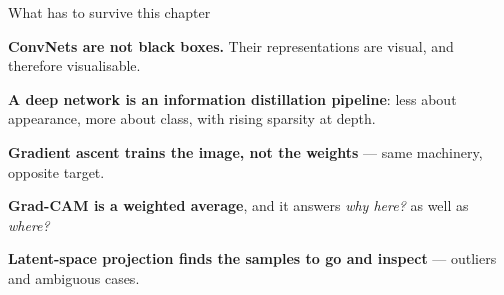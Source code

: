 \documentclass[aspectratio=169,11pt,t]{beamer}
\begin{document}
\begin{frame}[shrink=25]{What has to survive this chapter}
\begin{isteps}
\item \textbf{ConvNets are not black boxes.} Their representations are visual, and therefore visualisable.
\item \textbf{A deep network is an information distillation pipeline}: less about appearance, more about class, with rising sparsity at depth.
\item \textbf{Gradient ascent trains the image, not the weights} --- same machinery, opposite target.
\item \textbf{Grad-CAM is a weighted average}, and it answers \textit{why here?} as well as \textit{where?}
\item \textbf{Latent-space projection finds the samples to go and inspect} --- outliers and ambiguous cases.
\end{isteps}
\vskip 4pt
\vskip 2pt
\end{frame}
\end{document}
